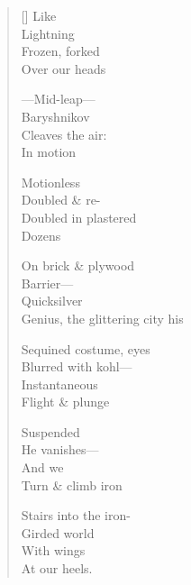 \label{ch:appearance}
\settowidth{\versewidth}{            Genius, the glittering city his}
\begin{verse}[\versewidth]
\hspace*{4\vgap} Like\\
\hspace*{3\vgap} Lightning\\
Frozen, forked\\
\hspace*{4\vgap} Over our heads

---Mid-leap---\\
\hspace*{3\vgap} Baryshnikov\\
\hspace*{4\vgap} Cleaves the air:\\
\hspace*{1\vgap} In motion

Motionless\\
Doubled \& re-\\
Doubled in plastered\\
Dozens

On brick \& plywood\\
Barrier---\\
\hspace*{4\vgap} Quicksilver\\
\hspace*{3\vgap} Genius, the glittering city his

Sequined costume, eyes\\
\hspace*{2\vgap} Blurred with kohl---\\
\hspace*{3\vgap} Instantaneous\\
Flight \& plunge

\hspace*{3\vgap} Suspended\\
He vanishes---\\
\hspace*{4\vgap} And we\\
Turn \& climb iron

Stairs into the iron-\\
Girded world\\
With wings\\
At our heels.
\end{verse}

